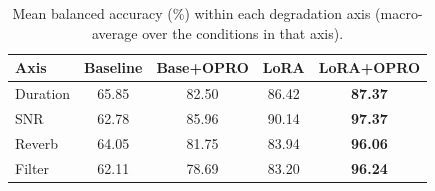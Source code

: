 \begin{table}[t]
\centering
\caption{Mean balanced accuracy (\%) within each degradation axis (macro-average over the conditions in that axis).}
\label{tab:r04_dimension_means}
\footnotesize
\setlength{\tabcolsep}{5pt}
\begin{tabular}{lcccc}
\toprule
\textbf{Axis} &
\textbf{Baseline} &
\textbf{Base+OPRO} &
\textbf{LoRA} &
\textbf{LoRA+OPRO} \\
\midrule
Duration & 65.85 & 82.50 & 86.42 & \textbf{87.37} \\
SNR & 62.78 & 85.96 & 90.14 & \textbf{97.37} \\
Reverb & 64.05 & 81.75 & 83.94 & \textbf{96.06} \\
Filter & 62.11 & 78.69 & 83.20 & \textbf{96.24} \\
\bottomrule
\end{tabular}
\end{table}